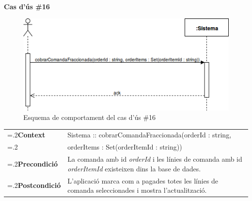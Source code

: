 \noindent\textbf{\large Cas d'ús \#16}\\
\begin{figure}[H]
\centering
\includegraphics[scale=0.6]{Figures/casdus_16.png}
\caption{Esquema de comportament del cas d'ús \#16}
\end{figure}
\begin{table}[h]
\noindent
\begin{tabularx}{\linewidth}{
>{\hsize=.2\hsize}X%
>{\hsize=0.8\hsize}X%
}
\textbf{Context} 		& Sistema :: cobrarComandaFraccionada(orderId : string,\\
						& orderItems : Set(orderItemId : string)) \\
\textbf{Precondició} 	& La comanda amb id \textit{orderId} i les línies de comanda amb id \textit{orderItemId} existeixen dins la base de dades. \\
\textbf{Postcondició}	& L'aplicació marca com a pagades totes les línies de comanda seleccionades i mostra l'actualització. \\
\end{tabularx}
\label{}
\end{table}

